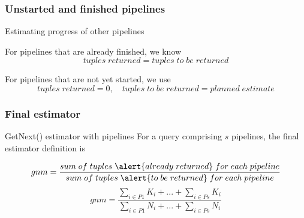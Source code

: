 \documentclass{beamer}
\begin{document}
\begin{frame}
  \frametitle{Unstarted and finished pipelines}

  \begin{block}{Estimating progress of other pipelines}

    For pipelines that are already \alert{finished}, we know
    \begin{equation*}
      tuples\;returned = tuples\;to\;be\;returned
    \end{equation*}

    \bigskip

    For pipelines that are \alert{not yet started}, we use
    \begin{equation*}
      tuples\;returned = 0, \quad tuples\;to\;be\;returned = planned\;estimate
    \end{equation*}
  \end{block}
\end{frame}

\begin{frame}
  \frametitle{Final estimator}

  \begin{block}{GetNext() estimator with pipelines}
    For a query comprising $s$ pipelines, the final estimator definition is
    \vspace{5mm}

    \begin{equation*}
      gnm = \frac{sum\;of\;tuples\;\alert{already\;returned}\;for\;each\;pipeline}
      {sum\;of\;tuples\;\alert{to\;be\;returned}\;for\;each\;pipeline}
    \end{equation*}
    \vspace{5mm}
    \begin{equation*}
      gnm = \frac{\sum\limits_{i \in P1} K_{i} + ... + \sum\limits_{i \in Ps} K_{i}}
      {\sum\limits_{i \in P1} N_{i} + ... + \sum\limits_{i \in Ps} N_{i}}
    \end{equation*}

  \end{block}
\end{frame}
\end{document}
